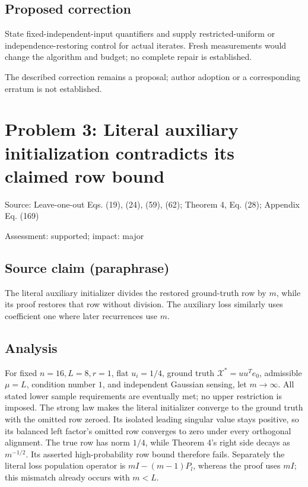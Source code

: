 \documentclass[11pt]{article}
\begin{document}
\subsection*{Proposed correction}

State fixed-independent-input quantifiers and supply restricted-uniform or independence-restoring control for actual iterates. Fresh measurements would change the algorithm and budget; no complete repair is established.

The described correction remains a proposal; author adoption or a corresponding erratum is not established.

\section*{Problem 3: Literal auxiliary initialization contradicts its claimed row bound}

Source: Leave-one-out Eqs. (19), (24), (59), (62); Theorem 4, Eq. (28); Appendix Eq. (169)

Assessment: supported; impact: major

\subsection*{Source claim (paraphrase)}

The literal auxiliary initializer divides the restored ground-truth row by \(m\), while its proof restores that row without division. The auxiliary loss similarly uses coefficient one where later recurrences use \(m\).

\subsection*{Analysis}

For fixed \(n=16,L=8,r=1\), flat \(u_i=1/4\), ground truth \(\mathcal X^*=uu^Te_0\), admissible \(\mu=L\), condition number \(1\), and independent Gaussian sensing, let \(m\to\infty\). All stated lower sample requirements are eventually met; no upper restriction is imposed. The strong law makes the literal initializer converge to the ground truth with the omitted row zeroed. Its isolated leading singular value stays positive, so its balanced left factor’s omitted row converges to zero under every orthogonal alignment. The true row has norm \(1/4\), while Theorem 4’s right side decays as \(m^{-1/2}\). Its asserted high-probability row bound therefore fails. Separately the literal loss population operator is \(mI-(m-1)P_l\), whereas the proof uses \(mI\); this mismatch already occurs with \(m<L\).
\end{document}
